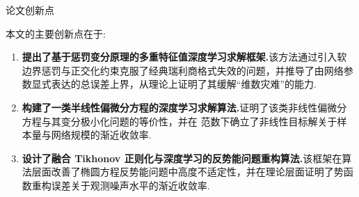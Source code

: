 
\newpage\vspace*{20pt}\thispagestyle{empty}
\begin{center}{\heiti 论文创新点}\end{center}
\par\vspace*{30pt}
\baselineskip=20pt


  本文的主要创新点在于:

\begin{enumerate}[(1)]
  \item  \textbf{提出了基于惩罚变分原理的多重特征值深度学习求解框架.}该方法通过引入软边界惩罚与正交化约束克服了经典瑞利商格式失效的问题，并推导了由网络参数显式表达的总误差上界，从理论上证明了其缓解“维数灾难”的能力.

  \item  \textbf{构建了一类半线性偏微分方程的深度学习求解算法.}证明了该类非线性偏微分方程与其变分极小化问题的等价性，并在   范数下确立了非线性目标解关于样本量与网络规模的渐近收敛率.

  \item  \textbf{设计了融合 Tikhonov 正则化与深度学习的反势能问题重构算法.}该框架在算法层面改善了椭圆方程反势能问题中高度不适定性，并在理论层面证明了势函数重构误差关于观测噪声水平的渐近收敛率.


\end{enumerate}

















  \iflib
  \let\cleardoublepage\clearpage
  \else
  \newpage
  \thispagestyle{empty}
  \cleardoublepage
  \fi



